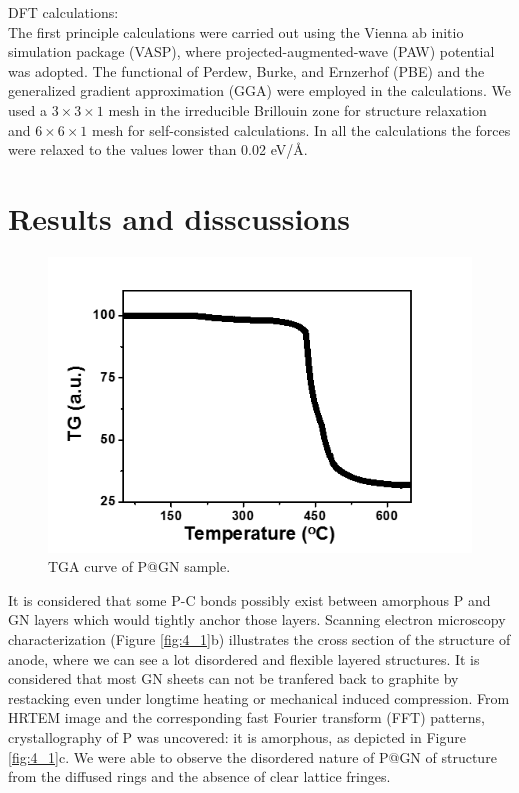 DFT calculations:\\
The first principle calculations were carried out using the Vienna ab initio simulation package (VASP),\cite{Kresse1996} where projected-augmented-wave (PAW) potential was adopted.\cite{Kresse1999} The functional of Perdew, Burke, and Ernzerhof (PBE) and the generalized gradient approximation (GGA)\cite{Perdew1996} were employed in the calculations. We used a $3\times3\times1$ mesh in the irreducible Brillouin zone for structure relaxation and $6\times6\times1$ mesh for self-consisted calculations. In all the calculations the forces were relaxed to the values lower than 0.02 eV/Å.

\section{Results and disscussions}


\begin{figure}  
\includegraphics[width=320pt]{figures/figure4_s4}
\caption[TGA curve of P@GN]
{TGA curve of P@GN sample.
\label{fig:4_s4}}
\end{figure}

It is considered that some P-C bonds possibly exist between amorphous P and GN layers which would tightly anchor those layers. Scanning electron microscopy characterization (Figure \ref{fig:4_1}b) illustrates the cross section of the structure of anode, where we can see a lot disordered and flexible layered structures. It is considered that most GN sheets can not be tranfered back to graphite by restacking even under longtime heating or mechanical induced compression.\cite{Huang2015b} From HRTEM image and the corresponding fast Fourier transform (FFT) patterns, crystallography of P was uncovered: it is amorphous, as depicted in Figure \ref{fig:4_1}c. We were able to observe the disordered nature of P@GN of structure from the diffused rings and the absence of clear lattice fringes. 

